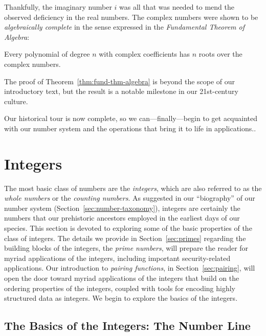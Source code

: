 Thankfully, the imaginary number $i$ was all that was needed to mend
the observed deficiency in the real numbers.  The complex numbers were
shown to be {\it algebraically complete}
in the sense expressed in the {\it Fundamental Theorem of Algebra}:

\begin{theorem}
\label{thm:fund-thm-algebra}
Every polynomial of degree $n$ with complex coefficients has $n$ roots
over the complex numbers.
\end{theorem}

The proof of Theorem~\ref{thm:fund-thm-algebra} is beyond the scope of
our introductory text, but the result is a notable milestone in our
21st-century culture.

Our historical tour is now complete, so we can---finally---begin to
get acquainted with our number system and the operations that bring it
to life in applications..

\section{Integers}
\label{sec:integers}

The most basic class of numbers are the {\it integers},
which are also referred to as the {\it whole numbers}
or the {\em counting numbers}.
%
As suggested in our ``biography'' of our number system
(Section~\ref{sec:number-taxonomy}), integers are certainly the
numbers that our prehistoric ancestors employed in the earliest days
of our species.  This section is devoted to exploring some of the
basic properties of the class of integers.  The details we provide in
Section~\ref{sec:primes} regarding the building blocks of the
integers, the {\it prime numbers}, 
will prepare the reader for myriad applications of the integers,
including important security-related applications.  Our introduction
to {\it pairing functions},
in Section~\ref{sec:pairing}, will open the door toward myriad 
applications of the integers that build on the ordering properties of
the integers, coupled with tools for encoding highly structured data
as integers.  We begin to explore the basics of the integers.

\subsection{The Basics of the Integers: The Number Line}
\label{sec:integer-number-line}

